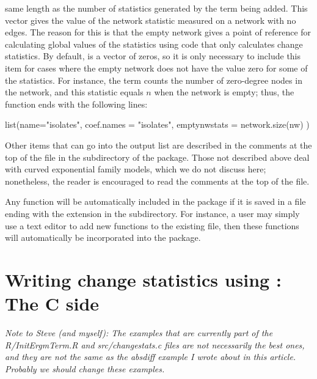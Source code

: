\documentclass[article]{jss}
\begin{document}
same length as the number of statistics generated by the term being added.  This vector 
gives the value of the network statistic measured on a network with no edges.  The reason for
this is that the empty network gives a point of reference for calculating global values of the statistics using  code that only calculates change statistics.  
By default,  is a vector of zeros, so it is only necessary to include this
item for cases where the empty network does not have the value zero for some of the statistics.
For instance, the  term counts the number of zero-degree nodes in the network,
and this statistic equals $n$ when the network is empty; thus, the 
function ends with the following lines:
\begin{CodeChunk}
\begin{CodeInput}
  list(name="isolates",
       coef.names = "isolates",
       emptynwstats = network.size(nw) )
\end{CodeInput}
\end{CodeChunk}

Other items that can go into the 
output list are described in the comments at the top of the
 file in the  subdirectory of the 
package.  Those not described above deal with curved exponential family models,
which we do not discuss here; nonetheless, the reader is encouraged to read the 
comments at the top of the  file.

Any  function will be automatically included in the 
package if it is saved in a file ending with the extension  in the  subdirectory.
For instance, a user may simply use a text editor to add new 
functions to the existing  file, then these
functions will automatically be incorporated into the 
package.

\section[Writing change statistics using ergmuserterms:  The C side]%
{Writing change statistics using :  The C side}
\label{Cside}

{\it Note to Steve (and myself):  The examples that are currently part of the R/InitErgmTerm.R and
src/changestats.c files are not necessarily the best ones, and they are not the same
as the absdiff example I wrote about in this article.  Probably we should change 
these examples.}
\end{document}
